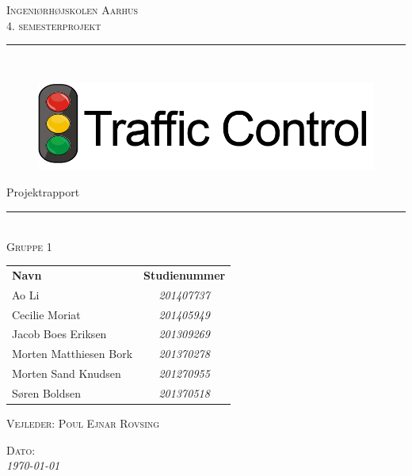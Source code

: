 \thispagestyle{empty}
\newcommand{\HRule}{\rule{\linewidth}{0.1mm}} %

\begin{center}
	\vspace{3cm}
	\textsc{\LARGE Ingeniørhøjskolen Aarhus}\\[1.5cm] %
	
	\textsc{\large 4. semesterprojekt}\\[2.5cm] 
	
	\HRule \\[0.8cm]
	\begin{figure}[h!]
		\centering
		\includegraphics[width=0.7\linewidth]{Forside/Logo}
	\end{figure}

	{\LARGE Projektrapport} \\[0.4cm]
	\HRule \\[1.5cm]
	

	
	\textsc{\large Gruppe 1}\\
	\vspace{0.5 in}
	\begin{center}
		\begin{tabular}{l c}
			\textbf{Navn} & \textbf{Studienummer} \\
			Ao Li & \textsl{201407737}    \\
			Cecilie Moriat & \textsl{201405949}  \\
			Jacob Boes Eriksen & \textsl{201309269} \\
			Morten Matthiesen Bork & \textsl{201370278}  \\
			Morten Sand Knudsen & \textsl{201270955}  \\
			Søren Boldsen & \textsl{201370518}  \\
			
		\end{tabular}
	\end{center}
	\vspace{0.5 in}
	
	\textsc{\large Vejleder: Poul Ejnar Rovsing}
	\vspace{0.5 in}
	
	\textsc{\large Dato: }\\
	{\large\textit{\today}} \\[3cm]
	\vfill %
	
\end{center} %

\clearpage

\newpage
